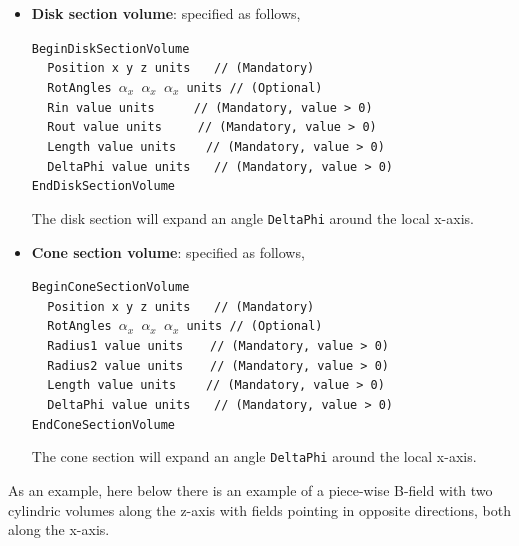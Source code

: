 \begin{itemize}
  \item {\bf Disk section volume}: specified as follows,
  
  \noindent
  {\tt BeginDiskSectionVolume} \\
  $~~~~~${\tt Position   x  y  z  units                       $~~~$ // (Mandatory)} \\
  $~~~~~${\tt RotAngles  $\alpha_x$  $\alpha_x$  $\alpha_x$  units  // (Optional)} \\
  $~~~~~${\tt Rin        value   units                   $~~~~~~~~$ // (Mandatory, value > 0)} \\
  $~~~~~${\tt Rout       value   units                    $~~~~~~~$ // (Mandatory, value > 0)} \\
  $~~~~~${\tt Length     value   units                      $~~~~~$ // (Mandatory, value > 0)} \\
  $~~~~~${\tt DeltaPhi   value   units                        $~~~$ // (Mandatory, value > 0)} \\
  {\tt EndDiskSectionVolume}
  
  \noindent
  The disk section will expand an angle {\tt DeltaPhi} around the local x-axis.
  
  \item {\bf Cone section volume}: specified as follows,
  
  \noindent
  {\tt BeginConeSectionVolume} \\
  $~~~~~${\tt Position   x  y  z  units                       $~~~$ // (Mandatory)} \\
  $~~~~~${\tt RotAngles  $\alpha_x$  $\alpha_x$  $\alpha_x$  units  // (Optional)} \\
  $~~~~~${\tt Radius1    value   units                       $~~~~$ // (Mandatory, value > 0)} \\
  $~~~~~${\tt Radius2    value   units                       $~~~~$ // (Mandatory, value > 0)} \\
  $~~~~~${\tt Length     value   units                      $~~~~~$ // (Mandatory, value > 0)} \\
  $~~~~~${\tt DeltaPhi   value   units                        $~~~$ // (Mandatory, value > 0)} \\
  {\tt EndConeSectionVolume}
  
  \noindent
  The cone section will expand an angle {\tt DeltaPhi} around the local x-axis.
  
\end{itemize}


As an example, here below there is an example of a piece-wise B-field with two cylindric volumes along the z-axis with fields pointing 
in opposite directions, both along the x-axis.

